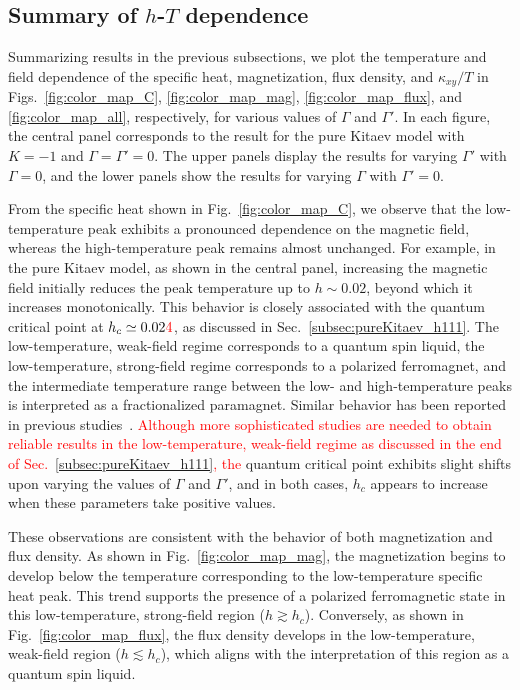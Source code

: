 \documentclass[twocolumn,superscriptaddress,showpacs, longbibliography, aps, prx]{revtex4-2}
\newcommand{\red}[1]{\textcolor{red}{#1}}
\begin{document}
\subsection{Summary of $h$-$T$ dependence}
\label{sec:summary_of_temp_field}
Summarizing results in the previous subsections, we plot the temperature and field dependence of the specific heat, magnetization, flux density, and $\kappa_{xy}/T$ in Figs.~\ref{fig:color_map_C}, \ref{fig:color_map_mag}, \ref{fig:color_map_flux}, and \ref{fig:color_map_all}, respectively, for various values of $\Gamma$ and $\Gamma'$. 
In each figure, the central panel corresponds to the result for the pure Kitaev model with $K=-1$ and $\Gamma=\Gamma'=0$. 
The upper panels display the results for varying $\Gamma'$ with $\Gamma=0$, and the lower panels show the results for varying $\Gamma$ with $\Gamma'=0$. 

From the specific heat shown in Fig.~\ref{fig:color_map_C}, we observe that the low-temperature peak exhibits a pronounced dependence on the magnetic field, whereas the high-temperature peak remains almost unchanged. For example, in the pure Kitaev model, as shown in the central panel, increasing the magnetic field initially reduces the peak temperature up to $h \sim 0.02$, beyond which it increases monotonically. This behavior is closely associated with the quantum critical point at $h_c \simeq 0.02\red{4}$, as discussed in Sec.~\ref{subsec:pureKitaev_h111}. 
The low-temperature, weak-field regime corresponds to a quantum spin liquid, the low-temperature, strong-field regime corresponds to a polarized ferromagnet, and the intermediate temperature range between the low- and high-temperature peaks is interpreted as a fractionalized paramagnet. Similar behavior has been reported in previous studies~\cite{YoshitakeNKM2020,Li2020,LiLXGQLS2024}.
\red{Although more sophisticated studies are needed to obtain reliable results in the low-temperature, weak-field regime as discussed in the end of Sec.~\ref{subsec:pureKitaev_h111}, 
the} quantum critical point exhibits slight shifts upon varying the values of $\Gamma$ and $\Gamma'$, and in both cases, $h_c$ appears to increase when these parameters take positive values. 

These observations are consistent with the behavior of both magnetization and flux density. 
As shown in Fig.~\ref{fig:color_map_mag}, the magnetization begins to develop below the temperature corresponding to the low-temperature specific heat peak. 
This trend supports the presence of a polarized ferromagnetic state in this low-temperature, strong-field region ($h \gtrsim h_c$). 
Conversely, as shown in Fig.~\ref{fig:color_map_flux}, the flux density develops in the low-temperature, weak-field region ($h \lesssim h_c$), which aligns with the interpretation of this region as a quantum spin liquid.
\end{document}
